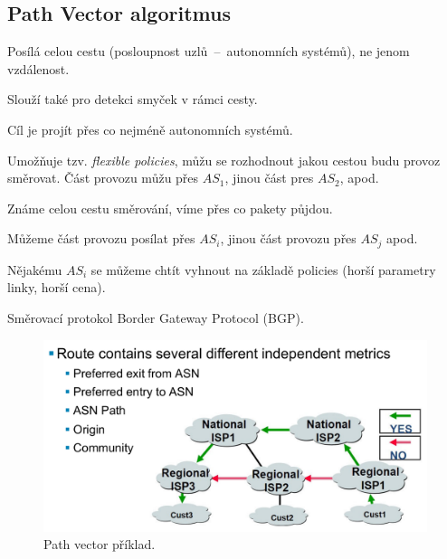 \subsection{Path Vector algoritmus}

\begin{compactitem}
    \item Posílá celou cestu (posloupnost uzlů~--~autonomních systémů), ne jenom vzdálenost.
    \item Slouží také pro detekci smyček v rámci cesty.
    \item Cíl je projít přes co nejméně autonomních systémů.
    \item Umožňuje tzv. \textit{flexible policies}, můžu se rozhodnout jakou cestou budu provoz směrovat. Část provozu můžu přes $AS_1$, jinou část pres $AS_2$, apod.
    \item Známe celou cestu směrování, víme přes co pakety půjdou. \begin{compactitem}
        \item Můžeme část provozu posílat přes $AS_i$, jinou část provozu přes $AS_j$ apod.
        \item Nějakému $AS_i$ se můžeme chtít vyhnout na základě policies (horší parametry linky, horší cena).
    \end{compactitem}
    \item Směrovací protokol Border Gateway Protocol (BGP).
\end{compactitem}

\begin{figure}[H]
    \centering
    \includegraphics[width=0.75\linewidth]{path_vector.pdf}
    \caption{Path vector příklad.}
\end{figure}
